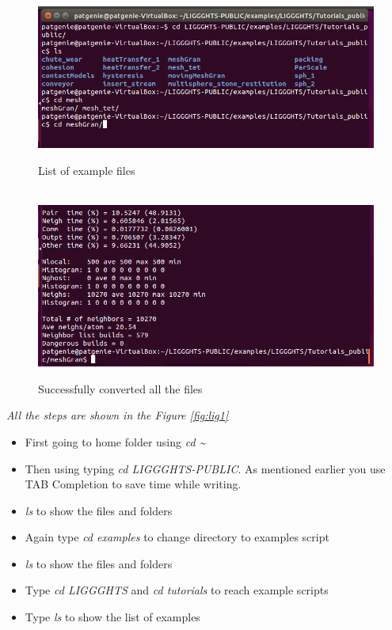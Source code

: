 \documentclass{tufte-book} %
\newcommand{\Li}{\textit{LIGGGHTS}}
\begin{document}
\begin{figure}
  \includegraphics[width=\linewidth]{graphics/Screenshot/Lig8.png}
  \caption[-14ex]{List of example files}
  \\\vspace{\baselineskip}
\includegraphics[width=\linewidth]{graphics/Screenshot/Lig13.png}
  \caption[-14ex]{Successfully converted all the files}
  \label{fig:lig8}
\end{figure}

\textit{All the steps are shown in the Figure \ref{fig:lig1}}
 \begin{itemize}
 \item First going to home folder using \textit{\emph{cd \~}}
 \item Then using typing \textit{\emph{cd \Li-PUBLIC}}. As mentioned earlier you use TAB Completion to save time while writing.
 \item \textit{\emph{ls}} to show the files and folders 
 \item Again type \textit{\emph{cd examples}} to change directory to examples script
 \item \textit{\emph{ls}} to show the files and folders
 \item Type \textit{\emph{cd \Li}} and \textit{\emph{cd tutorials}} to reach example scripts
   
 \item Type \textit{\emph{ls}} to show the list of examples
 \end{itemize}
\end{document}
